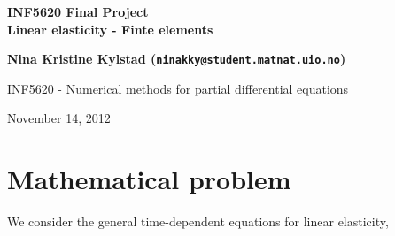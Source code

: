 \documentclass[twoside]{article}
\begin{document}






\begin{center}
{\LARGE\bf INF5620 Final Project}\\
{\LARGE\bf Linear elasticity - Finte elements}
\end{center}





\begin{center}
{\bf Nina Kristine Kylstad (\texttt{ninakky@student.matnat.uio.no})} \\ [0mm]
\end{center}

\vspace{0.5cm}
\begin{center}
\centerline{INF5620 - Numerical methods for partial differential equations}
\end{center}





\begin{center}
November 14, 2012
\end{center}

\vspace{1cm}


\begin{abstract}
This report investigates the time-dependent equations
for linear elasticity, and solving them using finite element 
methods.
\end{abstract}

\tableofcontents




\section{Mathematical problem}
We consider the general time-dependent equations for linear elasticity,
\end{document}
